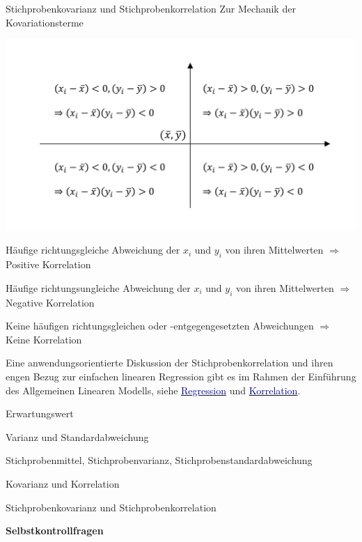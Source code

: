 \documentclass[
  8pt,
  ignorenonframetext,
]{beamer}
\begin{document}
\begin{frame}{Stichprobenkovarianz und Stichprobenkorrelation}
\protect\hypertarget{stichprobenkovarianz-und-stichprobenkorrelation-2}{}
Zur Mechanik der Kovariationsterme

\begin{center}\includegraphics[width=0.8\linewidth]{6_Abbildungen/wtfi_6_korrelationsterme} \end{center}
\vspace{-3mm}
\footnotesize

Häufige richtungsgleiche Abweichung der \(x_i\) und \(y_i\) von ihren
Mittelwerten \(\Rightarrow\) Positive Korrelation

Häufige richtungsungleiche Abweichung der \(x_i\) und \(y_i\) von ihren
Mittelwerten \(\Rightarrow\) Negative Korrelation

Keine häufigen richtungsgleichen oder -entgegengesetzten Abweichungen
\(\Rightarrow\) Keine Korrelation

\vspace{1mm}

Eine anwendungsorientierte Diskussion der Stichprobenkorrelation und
ihren engen Bezug zur einfachen linearen Regression gibt es im Rahmen
der Einführung des Allgemeinen Linearen Modells, siehe
\href{https://youtu.be/UNh-uhwLQG8}{\textcolor{darkblue}{Regression}}
und
\href{https://youtu.be/zfI6LoX8bc4}{\textcolor{darkblue}{Korrelation}}.
\end{frame}

\begin{frame}{}
\protect\hypertarget{section-10}{}
\large
\vfill

Erwartungswert

Varianz und Standardabweichung

Stichprobenmittel, Stichprobenvarianz, Stichprobenstandardabweichung

Kovarianz und Korrelation

Stichprobenkovarianz und Stichprobenkorrelation

\textbf{Selbstkontrollfragen} \vfill
\end{frame}
\end{document}
